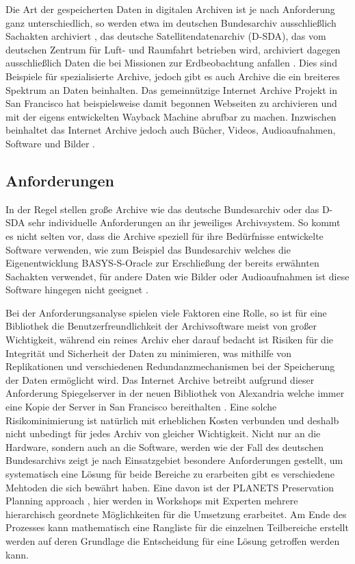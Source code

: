 \documentclass[conference,compsoc,final,a4paper]{IEEEtran}
\begin{document}
Die Art der gespeicherten Daten in digitalen Archiven ist je nach Anforderung ganz unterschiedlich, so werden etwa im deutschen Bundesarchiv ausschließlich Sachakten archiviert \autocite{Berger2005}, das deutsche Satellitendatenarchiv (\acs{D-SDA}), das vom deutschen Zentrum für Luft- und Raumfahrt betrieben wird, archiviert dagegen ausschließlich Daten die bei Missionen zur Erdbeobachtung anfallen \autocite{Memishi2019}. Dies sind Beispiele für spezialisierte Archive, jedoch gibt es auch Archive die ein breiteres Spektrum an Daten beinhalten. Das gemeinnützige Internet Archive Projekt in San Francisco hat beispielsweise damit begonnen Webseiten zu archivieren und mit der eigens entwickelten Wayback Machine abrufbar zu machen. Inzwischen beinhaltet das Internet Archive jedoch auch Bücher, Videos, Audioaufnahmen, Software und Bilder \autocite{AboutIA}.

\subsection{Anforderungen}
In der Regel stellen große Archive wie das deutsche Bundesarchiv oder das \acs{D-SDA} sehr individuelle Anforderungen an ihr jeweiliges Archivsystem. So kommt es nicht selten vor, dass die Archive speziell für ihre Bedürfnisse entwickelte Software verwenden, wie zum Beispiel das Bundesarchiv welches die Eigenentwicklung BASYS-S-Oracle zur Erschließung der bereits erwähnten Sachakten verwendet, für andere Daten wie Bilder oder Audioaufnahmen ist diese Software hingegen nicht geeignet \autocite{Berger2005}.

Bei der Anforderungsanalyse spielen viele Faktoren eine Rolle, so ist für eine Bibliothek die Benutzerfreundlichkeit der Archivsoftware meist von großer Wichtigkeit, während ein reines Archiv eher darauf bedacht ist Risiken für die Integrität und Sicherheit der Daten zu minimieren, was mithilfe von Replikationen und verschiedenen Redundanzmechanismen bei der Speicherung der Daten ermöglicht wird. Das Internet Archive betreibt aufgrund dieser Anforderung Spiegelserver in der neuen Bibliothek von Alexandria welche immer eine Kopie der Server in San Francisco bereithalten \autocite{BibAlexIAMirror}. Eine solche Risikominimierung ist natürlich mit erheblichen Kosten verbunden und deshalb nicht unbedingt für jedes Archiv von gleicher Wichtigkeit. Nicht nur an die Hardware, sondern auch an die Software, werden wie der Fall des deutschen Bundesarchivs zeigt je nach Einsatzgebiet besondere Anforderungen gestellt, um systematisch eine Lösung für beide Bereiche zu erarbeiten gibt es verschiedene Mehtoden die sich bewährt haben. Eine davon ist der PLANETS Preservation Planning approach \autocite{Strodl2007}, hier werden in Workshops mit Experten mehrere hierarchisch geordnete Möglichkeiten für die Umsetzung erarbeitet. Am Ende des Prozesses kann mathematisch eine Rangliste für die einzelnen Teilbereiche erstellt werden auf deren Grundlage die Entscheidung für eine Lösung getroffen werden kann.
\end{document}
